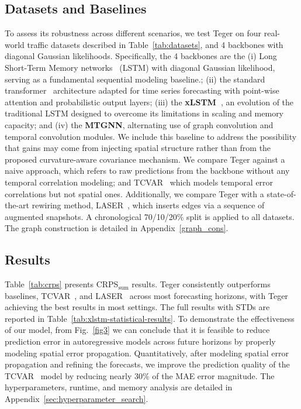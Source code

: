 \documentclass{article}
\theoremstyle{plain}
\theoremstyle{definition}
\theoremstyle{remark}
\begin{document}
\subsection{Datasets and Baselines}
\label{ssec:datasets}
To assess its robustness across different scenarios, we test Teger on four real-world traffic datasets described in
Table~\ref{tab:datasets}, and 4 backbones with
diagonal Gaussian likelihoods. 
Specifically, the 4 backbones are the (i) Long Short-Term Memory networks~\cite{salinas2019highdimensional} (LSTM) with diagonal Gaussian likelihood, serving as a fundamental sequential modeling baseline.; (ii) the standard transformer~\cite{vaswani2023attention} architecture adapted for time series forecasting with point-wise attention and probabilistic output layers; (iii) the \textbf{xLSTM~\cite{beck2024xlstm}}, an evolution of the traditional LSTM designed to overcome its limitations in scaling and memory capacity; and (iv) the \textbf{MTGNN}\cite{10.1145/3394486.3403118}, alternating use of graph convolution and temporal convolution modules. We include this baseline to address the possibility that gains may come from injecting spatial structure rather than from the proposed curvature-aware covariance mechanism.
We compare Teger against a naive approach, which refers to raw predictions from the backbone without any temporal correlation modeling; and TCVAR~\cite{zheng2024multivariateprobabilistictimeseries}
which models temporal error correlations but not spatial ones. Additionally, we compare Teger with a state-of-the-art rewiring method, LASER~\cite{barbero2024laser}, which inserts edges via a sequence of augmented snapshots. A chronological 70/10/20\% split is applied to all datasets. The graph construction is detailed in Appendix~\ref{graph_cons}.





\subsection{Results}
\label{ssec:results}

Table~\ref{tab:crps} presents CRPS$_{\mathrm{sum}}$ results. Teger consistently outperforms baselines, TCVAR~\cite{zheng2024multivariateprobabilistictimeseries}, and LASER~\cite{barbero2024laser} across most forecasting horizons, with Teger achieving the best results in most settings. The full results with STDs are reported in Table~\ref{tab:xlstm-statistical-results}.
To demonstrate the effectiveness of our model, from Fig.~\ref{fig3} we can conclude that it is feasible to reduce prediction error in autoregressive models across future horizons by properly modeling spatial error propagation. Quantitatively, after modeling spatial error propagation and refining the forecasts, we improve the prediction quality of the TCVAR~\cite{zheng2024multivariateprobabilistictimeseries} model by reducing nearly 30\% of the MAE error magnitude. The hyperparameters, runtime, and memory analysis are detailed in Appendix~\ref{sec:hyperparameter_search}.
\end{document}
